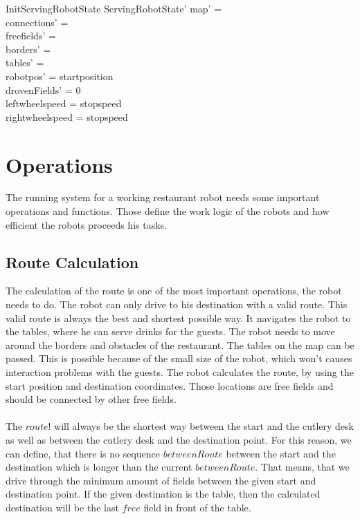 \documentclass[11pt,a4paper]{article}
\begin{document}
\begin{schema}{InitServingRobotState}
ServingRobotState'
\where
map' = \emptyset \\
connections' = \emptyset\\
freefields' = \emptyset \\
borders' = \emptyset \\
tables' = \emptyset \\
robotpos'  = startposition \\
drovenFields' = 0\\
leftwheelspeed = stopspeed \\
rightwheelspeed = stopspeed
\end{schema}

\section{Operations}

The running system for a working restaurant robot needs some important operations and functions. Those define the work logic of the robots and how efficient the robots proceeds his tasks.

\subsection{Route Calculation}
The calculation of the route is one of the most important operations, the robot needs to do. The robot can only drive to his destination with a valid route. This valid route is always the best and shortest possible way. It navigates the robot to the tables, where he can serve drinks for the guests. The robot needs to move around the borders and obstacles of the restaurant. The tables on the map can be passed. This is possible because of the small size of the robot, which won't causes interaction problems with the guests. The robot calculates the route, by using the start position and destination coordinates. Those locations are free fields and should be connected by other free fields.\\\\

The \(route!\) will always be the shortest way between the start and the cutlery desk as well as between the cutlery desk and the destination point. For this reason, we can define, that there is no sequence \( betweenRoute \) between the start and the destination which is longer than the current \( betweenRoute \). That means, that we drive through the minimum amount of fields between the given start and destination point. If the given destination is the table, then the calculated destination will be the last \(free\) field in front of the table.\\
\end{document}
